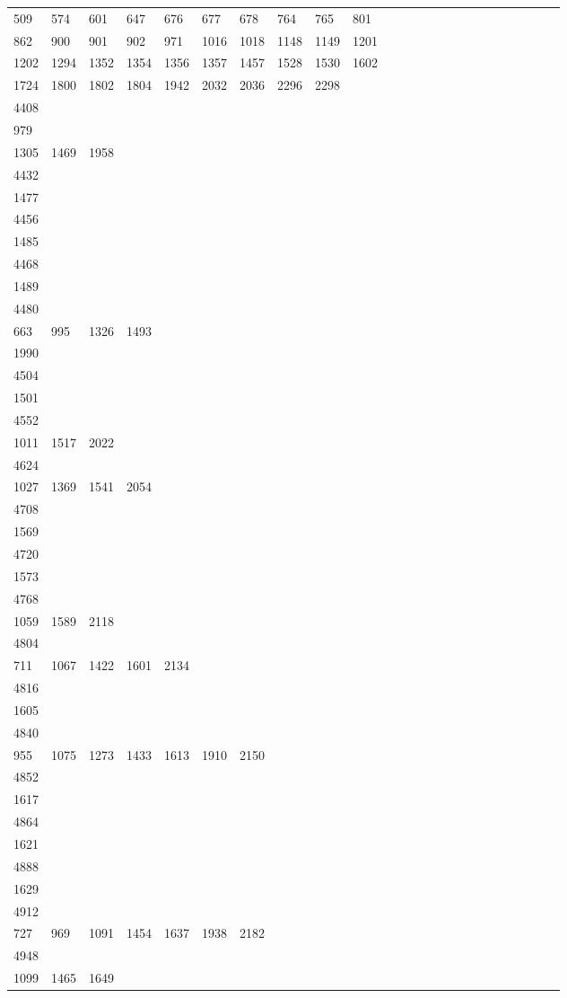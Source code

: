 \begin{longtable}{*{24}{l}}
509& 574& 601& 647& 676& 677& 678& 764& 765& 801\\
862& 900& 901& 902& 971& 1016& 1018& 1148& 1149& 1201\\
1202& 1294& 1352& 1354& 1356& 1357& 1457& 1528& 1530& 1602\\
1724& 1800& 1802& 1804& 1942& 2032& 2036& 2296& 2298& \\
4408&&&&&&&&&\\
979\\
1305& 1469& 1958& \\
4432&&&&&&&&&\\
1477& \\
4456&&&&&&&&&\\
1485& \\
4468&&&&&&&&&\\
1489& \\
4480&&&&&&&&&\\
663& 995& 1326& 1493\\
1990& \\
4504&&&&&&&&&\\
1501& \\
4552&&&&&&&&&\\
1011& 1517& 2022& \\
4624&&&&&&&&&\\
1027& 1369& 1541& 2054& \\
4708&&&&&&&&&\\
1569\\
4720&&&&&&&&&\\
1573& \\
4768&&&&&&&&&\\
1059& 1589& 2118& \\
4804&&&&&&&&&\\
711& 1067& 1422& 1601& 2134& \\
4816&&&&&&&&&\\
1605\\
4840&&&&&&&&&\\
955& 1075& 1273& 1433& 1613& 1910& 2150& \\
4852&&&&&&&&&\\
1617& \\
4864&&&&&&&&&\\
1621& \\
4888&&&&&&&&&\\
1629\\
4912&&&&&&&&&\\
727& 969& 1091& 1454& 1637& 1938& 2182& \\
4948&&&&&&&&&\\
1099& 1465& 1649\\

\end{longtable}
